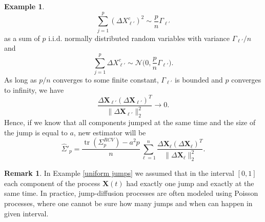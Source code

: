 \documentclass[a4paper,11pt]{book}
\theoremstyle{plain}
\theoremstyle{definition}
\newtheorem{exmp}[thm]{Example}
\newtheorem{rmrk}[thm]{Remark}
\newcommand{\tr}{\operatorname{tr}}
\begin{document}
\begin{exmp}
    		\[
    		\sum_{j=1}^{p} (\Delta X^c_{\ell'})^2 \sim \frac{p}{n}\Gamma_{\ell'}
    		\]
    		as a sum of $p$ i.i.d. normally distributed random variables with variance $\Gamma_{\ell'}/n$ and
    		\[ \sum_{j=1}^{p} \Delta X^c_{\ell'} \sim \mathcal{N}\Big(0, \frac{p}{n}\Gamma_{\ell'}\Big). \]
    		As long as $p/n$ converges to some finite constant, $\Gamma_{\ell'}$ is bounded and $p$ converges to infinity, we have
    		\[ 
    		\frac{\Delta \mathbf{X}_{\ell'}(\Delta \mathbf{X}_{\ell'})^T}{\| \Delta \mathbf{X}_{\ell'} \|_2^2} \rightarrow 0.
    		\]
    		Hence, if we know that all components jumped at the same time and the size of the jump is equal to $a$, new estimator will be
    		\[ 
    		\widehat{\Sigma}'_p = \frac{\tr(\Sigma_p^{RCV}) - a^2p}{n} \sum_{\ell=1}^{n} \frac{\Delta \mathbf{X}_{\ell}(\Delta \mathbf{X}_{\ell})^T}{\| \Delta \mathbf{X}_{\ell} \|_2^2}.
    		\]
    \end{exmp}
    
    \begin{rmrk}
    	In Example \ref{uniform jumps} we assumed that in the interval $[0, 1]$ each component of the process $\mathbf{X}(t)$ had exactly one jump and exactly at the same time. In practice, jump-diffusion processes are often modeled using Poisson processes, where one cannot be sure how many jumps and when can happen in given interval.
    \end{rmrk}
    
\end{document}
